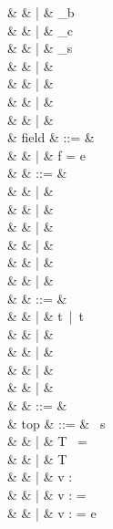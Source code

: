 \documentclass[a4paper]{article}
\begin{document}
\begin{grammar}
                    &   & |   & \ell_b \\
                    &   & |   & \ell_c \\
                    &   & |   & \ell_s \\
                    &   & |   &  \\
                    &   & |   &  \\
                    &   & |   &  \\
                    &   & |   &  \\
   & field & ::= & \sALLFIELDS \\
               &       & |   & f = e \\
   & \tau & ::= & \stynf{\tau} \\
              &      & |   & \sUNBOX \tau \\
              &      & |   & \tau \sBANG \\
              &      & |   &  \\
              &      & |   & \stytake{\tau}{\sALLFIELDS} \\
              &      & |   &  \\
              &      & |   & \styput{\tau}{\sALLFIELDS} \\
   & \stynf{\tau} & ::= &  \\
                   &              & |   & t\sBANG\ |\ t \\
                   &              & |   & \styfun{\tau}{\tau} \\
                   &              & |   &  \\
                   &              & |   &  \\
                   &              & |   &  \\
   & \sigma & ::= & \ \tau \\
   & top & ::= & \sINCLUDE\ s \\
                   &     & |   & T\  = \tau \\
                   &     & |   & T\  \\ 
                   &     & |   & v : \sigma \\
                   &     & |   & v : \sigma =  \\ 
                   &     & |   & v : \tau = e
\end{grammar} 
\end{document}
